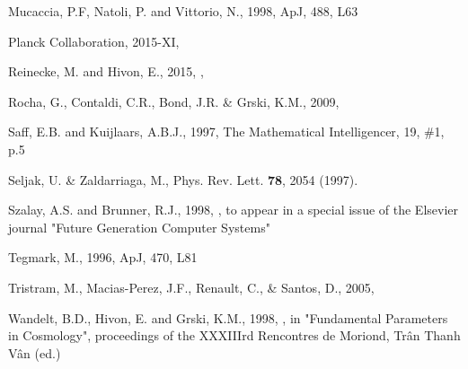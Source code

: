 \documentclass[12pt,twoside]{article}
\begin{document}
\begin{thebibliography}{99}
Mucaccia, P.F, Natoli, P. and Vittorio, N., 1998, ApJ, 488, L63
\backrefprint%

Planck Collaboration, 2015-XI, 
\backrefprint%

Reinecke, M. and Hivon, E., 2015, 
, 
\backrefprint%

Rocha, G., Contaldi, C.R., Bond, J.R. \& G{\oacute}rski, K.M., 2009,
\backrefprint%

Saff, E.B. and Kuijlaars, A.B.J., 1997, The Mathematical 
Intelligencer, 19, \#1, p.5
\backrefprint%

Seljak, U. \& Zaldarriaga, M., Phys. Rev. Lett. \textbf{78}, 2054 (1997).   
\backrefprint%

Szalay, A.S. and Brunner, R.J., 1998, 
, to appear in 
a special issue of the Elsevier journal "Future Generation Computer Systems"
\backrefprint%

Tegmark, M., 1996, ApJ, 470, L81
\backrefprint%

Tristram, M., Macias-Perez, J.F., Renault, C., \& Santos, D., 2005, 
\backrefprint%

Wandelt, B.D., Hivon, E. and G{\oacute}rski, K.M., 1998, 
, in
 "Fundamental Parameters in Cosmology", proceedings of the XXXIIIrd Rencontres
de Moriond, Tr{\^a}n Thanh V{\^a}n (ed.)
\backrefprint%


\end{thebibliography}
\end{document}
